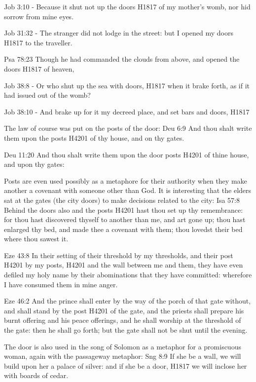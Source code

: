 \documentclass[11pt]{article}
\begin{document}
Job 3:10 - Because it shut not up the doors H1817 of my mother's womb, nor hid sorrow from mine eyes.

Job 31:32 - The stranger did not lodge in the street: but I opened my doors H1817 to the traveller.

Psa 78:23
Though he had commanded the clouds from above, and opened the doors H1817 of heaven,

Job 38:8 - Or who shut up the sea with doors, H1817 when it brake forth, as if it had issued out of the womb?

Job 38:10 - And brake up for it my decreed place, and set bars and doors, H1817


The law of course was put on the posts of the door:
Deu 6:9
And thou shalt write them upon the posts H4201 of thy house, and on thy gates.

Deu 11:20
And thou shalt write them upon the door posts H4201 of thine house, and upon thy gates:


Posts are even used possibly as a metaphore for their authority when they make another a covenant with someone other than God. It is interesting that the elders sat at the gates (the city doors) to make decisions related to the city:
Isa 57:8
Behind the doors also and the posts H4201 hast thou set up thy remembrance: for thou hast discovered thyself to another than me, and art gone up; thou hast enlarged thy bed, and made thee a covenant with them; thou lovedst their bed where thou sawest it.

Eze 43:8
In their setting of their threshold by my thresholds, and their post H4201 by my posts, H4201 and the wall between me and them, they have even defiled my holy name by their abominations that they have committed: wherefore I have consumed them in mine anger.

Eze 46:2
And the prince shall enter by the way of the porch of that gate without, and shall stand by the post H4201 of the gate, and the priests shall prepare his burnt offering and his peace offerings, and he shall worship at the threshold of the gate: then he shall go forth; but the gate shall not be shut until the evening.

The door is also used in the song of Solomon as a metaphor for a promiscuous woman, again with the passageway metaphor:
Sng 8:9
If she be a wall, we will build upon her a palace of silver: and if she be a door, H1817 we will inclose her with boards of cedar.
\end{document}
